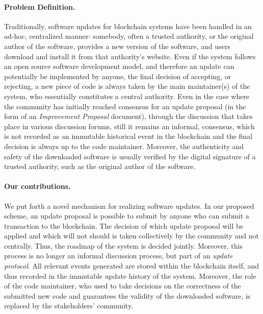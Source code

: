 \paragraph{Problem Definition.}
Traditionally, software updates for blockchain systems have been handled in an ad-hoc, centralized manner: somebody, often a trusted authority, or the original author of the software, provides a new version of the software, and users
download and install it from that authority's website. Even if the system follows an open source software development model, and therefore an update can potentially be implemented by anyone, the final decision of accepting, or rejecting, a new piece of code is always taken by the main maintainer(s) of the system, who essentially constitutes a central authority. Even in the case where the community has initially reached consensus for an update proposal (in the form of an \emph{Improvement Proposal} document), through the discussion that takes place in various discussion forums, still it remains an informal,  consensus, which is not recorded as an immutable historical event in the blockchain and the final decision is always up to the code maintainer. Moreover, the authenticity and safety of the downloaded software is usually verified by the digital signature of a trusted authority, such as the original author of the software.

\paragraph{Our contributions.}
We put forth a novel mechanism for realizing software updates. In our proposed scheme, an update proposal is possible to submit by anyone who can submit a transaction to the blockchain. The decision of which update proposal will be applied and which will not should is taken collectively by the community and not centrally. Thus, the roadmap of the system is decided jointly. Moreover, this process is no longer an informal discussion process, but part of an \emph{update protocol}. All relevant events generated are stored within the blockchain itself, and thus recorded in the immutable update history of the system. Moreover, the role of the code maintainer, who used to take decisions on the correctness of the submitted new code and guarantees the validity of the downloaded software, is replaced by the stakeholders' community.

